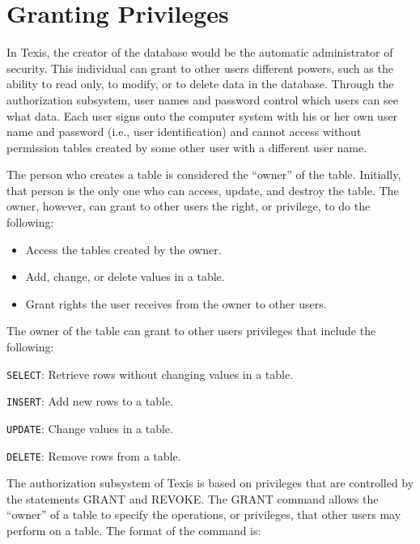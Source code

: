 \section{Granting Privileges}

In Texis, the creator of the database would be the automatic
administrator of security.  This individual can grant to other users
different powers, such as the ability to read only, to modify, or to
delete data in the database.  Through the authorization subsystem,
user names and password control which users can see what data.  Each
user signs onto the computer system with his or her own user name and
password (i.e., user identification) and cannot access without
permission tables created by some other user with a different user
name.

The person who creates a table is considered the ``owner'' of the
table.  Initially, that person is the only one who can access, update,
and destroy the table. The owner, however, can grant to other users
the right, or privilege, to do the following:

\begin{itemize}
\item Access the tables
created by the owner.
\item Add, change, or delete values in a table.
\item Grant rights the user receives from the owner to other users.
\end{itemize}

The owner of the table can grant to other users privileges that
include the following:

\begin{description}
\item \verb`SELECT`: Retrieve rows without changing values in a table.
\item \verb`INSERT`: Add new rows to a table.
\item \verb`UPDATE`: Change values in a table.
\item \verb`DELETE`: Remove rows from a table.
\end{description}

The authorization subsystem of Texis is based on privileges that are
controlled by the statements GRANT and REVOKE.  The GRANT command
allows the ``owner'' of a table to specify the operations, or
privileges, that other users may perform on a table.  The format of
the command is:

